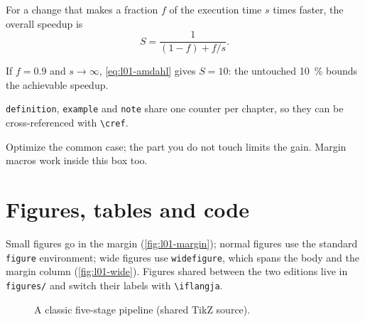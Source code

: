 \documentclass[../main.tex]{subfiles}
\begin{document}
\begin{definition}[Speedup]
  For a change that makes a fraction $f$ of the execution time $s$ times
  faster, the overall speedup is
  \begin{equation}
    S = \frac{1}{(1-f) + f/s}.
    \label{eq:l01-amdahl}
  \end{equation}
\end{definition}

\begin{example}
  If $f = 0.9$ and $s \to \infty$, \cref{eq:l01-amdahl} gives $S = 10$: the
  untouched \SI{10}{\percent} bounds the achievable speedup.
\end{example}

\begin{note}
  \verb|definition|, \verb|example| and \verb|note| share one counter per
  chapter, so they can be cross-referenced with \verb|\cref|.
\end{note}

\begin{keypoint}
  Optimize the common case; the part you do not touch limits the gain.
  Margin macros work inside this box too.
\end{keypoint}

\section{Figures, tables and code}

\begin{marginfigure}
  \caption{A figure in the margin (\texttt{marginfigure}).}
  \label{fig:l01-margin}
\end{marginfigure}

Small figures go in the margin (\cref{fig:l01-margin}); normal figures use the
standard \verb|figure| environment; wide figures use \verb|widefigure|,
which spans the body and the margin column (\cref{fig:l01-wide}).  Figures shared
between the two editions live in \texttt{figures/} and switch their labels
with \verb|\iflangja|.

\begin{figure}[htbp]
  \centering
  
  \caption{A classic five-stage pipeline (shared TikZ source).}
  \label{fig:l01-pipeline}
\end{figure}
\end{document}
